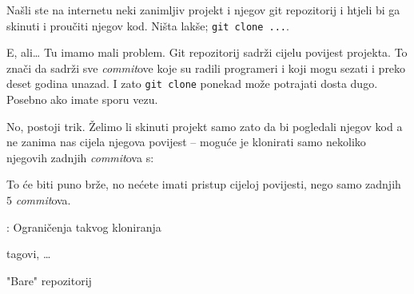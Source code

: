 Našli ste na internetu neki zanimljiv projekt i njegov git repozitorij i htjeli bi ga skinuti i proučiti njegov kod. 
Ništa lakše; \verb+git clone ...+.

E, ali\dots
Tu imamo mali problem.
Git repozitorij sadrži cijelu povijest projekta. 
To znači da sadrži sve \emph{commit}ove koje su radili programeri i koji mogu sezati i preko deset godina unazad.
I zato \verb+git clone+ ponekad može potrajati dosta dugo. 
Posebno ako imate sporu vezu.

No, postoji trik.
Želimo li skinuti projekt samo zato da bi pogledali njegov kod a ne zanima nas cijela njegova povijest -- moguće je klonirati samo nekoliko njegovih zadnjih \emph{commit}ova s:


To će biti puno brže, no nećete imati pristup cijeloj povijesti, nego samo zadnjih $5$ \emph{commit}ova.

\TODO: Ograničenja takvog kloniranja

tagovi, \dots

\TODO "Bare" repozitorij


